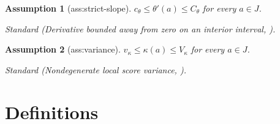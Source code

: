 \documentclass{article}
\newtheorem{assumption}{Assumption}
\begin{document}
\begin{assumption}[ass:strict-slope]\label{ass:strict-slope}
\(c_{\theta}\le\theta'(a)\le C_{\theta}\) for every \(a\in J\).
\par\smallskip\noindent\emph{Standard} (Derivative bounded away from zero on an interior interval, \cite{DurotKulikovLopuhaa2012}).
\end{assumption}

\begin{assumption}[ass:variance]\label{ass:variance}
\(v_{\kappa}\le\kappa(a)\le V_{\kappa}\) for every \(a\in J\).
\par\smallskip\noindent\emph{Standard} (Nondegenerate local score variance, \cite{Doss2026PointwiseLR}).
\end{assumption}

\section{Definitions}
\end{document}

